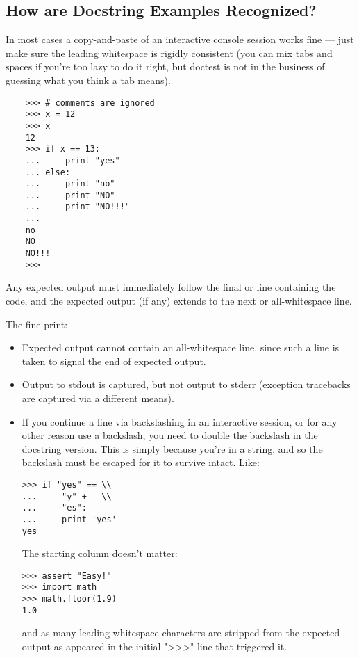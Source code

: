 \subsection{How are Docstring Examples Recognized?}

In most cases a copy-and-paste of an interactive console session works fine
--- just make sure the leading whitespace is rigidly consistent (you can mix
tabs and spaces if you're too lazy to do it right, but doctest is not in
the business of guessing what you think a tab means).

\begin{verbatim}
    >>> # comments are ignored
    >>> x = 12
    >>> x
    12
    >>> if x == 13:
    ...     print "yes"
    ... else:
    ...     print "no"
    ...     print "NO"
    ...     print "NO!!!"
    ...
    no
    NO
    NO!!!
    >>>
\end{verbatim}

Any expected output must immediately follow the final  or
 line containing the code, and the expected output (if any)
extends to the next  or all-whitespace line.

The fine print:

\begin{itemize}

\item Expected output cannot contain an all-whitespace line, since such a
  line is taken to signal the end of expected output.

\item Output to stdout is captured, but not output to stderr (exception
  tracebacks are captured via a different means).

\item If you continue a line via backslashing in an interactive session, or
  for any other reason use a backslash, you need to double the backslash in
  the docstring version.  This is simply because you're in a string, and so
  the backslash must be escaped for it to survive intact.  Like:

\begin{verbatim}
>>> if "yes" == \\
...     "y" +   \\
...     "es":
...     print 'yes'
yes
\end{verbatim}

The starting column doesn't matter:

\begin{verbatim}
>>> assert "Easy!"
>>> import math
>>> math.floor(1.9)
1.0
\end{verbatim}

and as many leading whitespace characters are stripped from the expected
output as appeared in the initial ">>>" line that triggered it.
\end{itemize}

